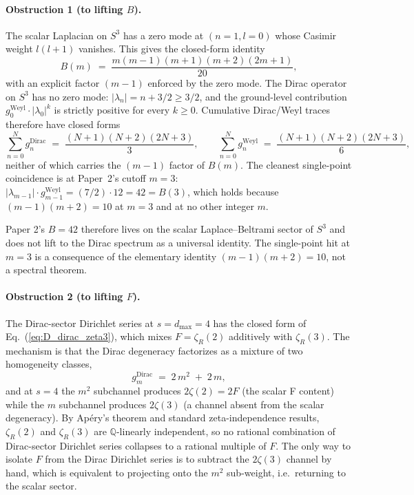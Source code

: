 \paragraph{Obstruction 1 (to lifting $B$).}
The scalar Laplacian on $S^3$ has a zero mode at $(n=1, l=0)$ whose
Casimir weight $l(l+1)$ vanishes. This gives the closed-form identity
\begin{equation}\label{eq:Bclosed_repeat}
  B(m) \;=\; \frac{m(m-1)(m+1)(m+2)(2m+1)}{20},
\end{equation}
with an explicit factor $(m-1)$ enforced by the zero mode. The Dirac
operator on $S^3$ has no zero mode: $|\lambda_n| = n+3/2 \geq 3/2$, and
the ground-level contribution $g_0^{\text{Weyl}}\cdot|\lambda_0|^k$ is
strictly positive for every $k \geq 0$. Cumulative Dirac/Weyl traces
therefore have closed forms
\begin{equation}
  \sum_{n=0}^{N} g_n^{\text{Dirac}}
  \;=\; \frac{(N+1)(N+2)(2N+3)}{3},
  \qquad
  \sum_{n=0}^{N} g_n^{\text{Weyl}}
  \;=\; \frac{(N+1)(N+2)(2N+3)}{6},
\end{equation}
neither of which carries the $(m-1)$ factor of $B(m)$. The cleanest
single-point coincidence is at Paper~2's cutoff $m=3$:
$|\lambda_{m-1}|\cdot g_{m-1}^{\text{Weyl}} = (7/2)\cdot 12 = 42 = B(3)$,
which holds because $(m-1)(m+2) = 10$ at $m=3$ and at no other integer
$m$.

Paper 2's $B = 42$ therefore lives on the scalar Laplace--Beltrami
sector of $S^3$ and does not lift to the Dirac spectrum as a universal
identity. The single-point hit at $m=3$ is a consequence of the
elementary identity $(m-1)(m+2) = 10$, not a spectral theorem.

\paragraph{Obstruction 2 (to lifting $F$).}
The Dirac-sector Dirichlet series at $s = d_{\max}=4$ has the closed
form of Eq.~(\ref{eq:D_dirac_zeta3}), which mixes $F = \zeta_R(2)$
additively with $\zeta_R(3)$. The mechanism is that the Dirac degeneracy
factorizes as a mixture of two homogeneity classes,
\begin{equation}
  g_m^{\text{Dirac}} \;=\; 2\,m^2 \;+\; 2\,m,
\end{equation}
and at $s = 4$ the $m^2$ subchannel produces $2\zeta(2) = 2F$ (the
scalar F content) while the $m$ subchannel produces $2\zeta(3)$ (a
channel absent from the scalar degeneracy). By Apéry's theorem and
standard zeta-independence results, $\zeta_R(2)$ and $\zeta_R(3)$ are
$\mathbb{Q}$-linearly independent, so no rational combination of
Dirac-sector Dirichlet series collapses to a rational multiple of $F$.
The only way to isolate $F$ from the Dirac Dirichlet series is to
subtract the $2\zeta(3)$ channel by hand, which is equivalent to
projecting onto the $m^2$ sub-weight, i.e.\ returning to the scalar
sector.

